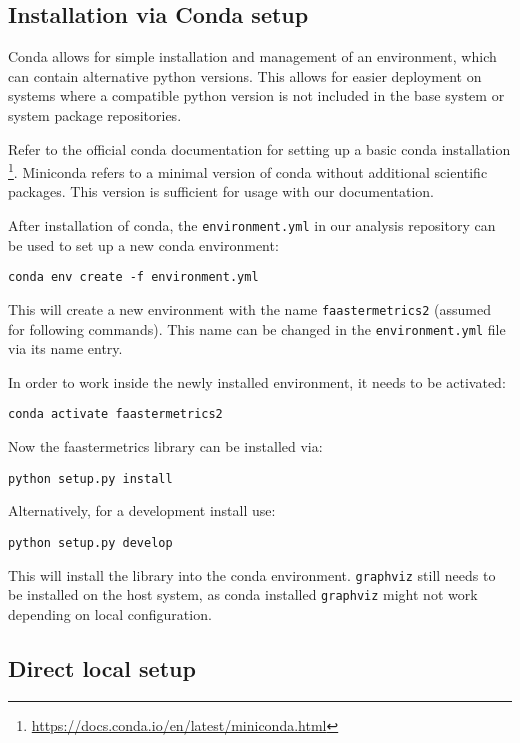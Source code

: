 \documentclass[../main.tex]{subfiles}
\begin{document}
\subsection{Installation via Conda setup}%
\label{sub:analysisCondaSetup}

Conda allows for simple installation and management of an environment, which can contain alternative python versions. 
This allows for easier deployment on systems where a compatible python version is not included in the base system or system package repositories. 

Refer to the official conda documentation for setting up a basic conda installation%
\footnote{\url{https://docs.conda.io/en/latest/miniconda.html}}. 
Miniconda refers to a minimal version of conda without additional scientific packages. 
This version is sufficient for usage with our documentation.

After installation of conda, the \texttt{environment.yml} in our analysis repository can be used to set up a new conda environment:
\begin{tcolorbox}
  \texttt{conda env create -f environment.yml}
\end{tcolorbox}\noindent
This will create a new environment with the name \texttt{faastermetrics2} (assumed for following commands). 
This name can be changed in the \texttt{environment.yml} file via its name entry.

In order to work inside the newly installed environment, it needs to be activated:
\begin{tcolorbox}
  \texttt{conda activate faastermetrics2}
\end{tcolorbox}\noindent
Now the faastermetrics library can be installed via:
\begin{tcolorbox}
  \texttt{python setup.py install}
\end{tcolorbox}\noindent
Alternatively, for a development install use:
\begin{tcolorbox}
  \texttt{python setup.py develop}
\end{tcolorbox}\noindent
This will install the library into the conda environment. 
\texttt{graphviz} still needs to be installed on the host system, 
as conda installed \texttt{graphviz} might not work depending on local configuration.

\subsection{Direct local setup}%
\label{sub:analysisManualSetup}
\end{document}
